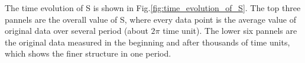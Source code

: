 \documentclass[onecolumn,pra]{revtex4-1}
\begin{document}


The time evolution of S is shown in Fig.\ref{fig:time_evolution_of_S}. The top three pannels are the overall value of S, where every data point is the average value of original data over several period (about $2\pi$ time unit). The lower six pannels are the original data measured in the beginning and after thousands of time units, which shows the finer structure in one period. 
\end{document}
